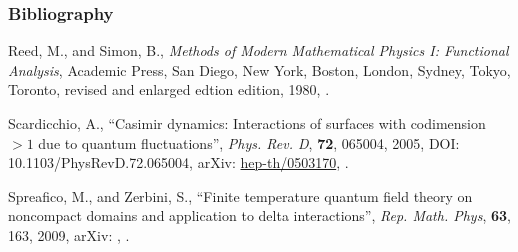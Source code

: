 \documentclass[10pt,t]{beamer}
\begin{document}
\begin{frame}
  \frametitle{Bibliography}


  \begin{thebibliography}{99}

   Reed,
    M., and Simon, B., \emph{Methods of Modern Mathematical Physics I:
      Functional Analysis}, Academic Press, San Diego, New York,
    Boston, London, Sydney, Tokyo, Toronto, revised and enlarged
    edtion edition, 1980,
    \cite{ReedSimonMethodsOfModernMathematicalPhysicsVolI1980}.

   Scardicchio, A., ``Casimir
    dynamics: Interactions of surfaces with codimension $> 1$ due to
    quantum fluctuations'', \emph{Phys. Rev. D}, \textbf{72}, 065004,
    2005, DOI: 10.1103/PhysRevD.72.065004, arXiv:
    \href{https://arxiv.org/abs/hep-th/0503170}{hep-th/0503170},
    \cite{ScardicchioCasimirDynamics2005}.

    Spreafico, M., and Zerbini, S., ``Finite temperature quantum field
    theory on noncompact domains and application to delta
    interactions'', \emph{Rep. Math. Phys}, \textbf{63}, 163, 2009,
    arXiv: ,
    \cite{SpreaficoZerbiniFiniteTemperatureQFTOnNoncompactDomains2009}.

  \end{thebibliography}

\end{frame}











\end{document}

